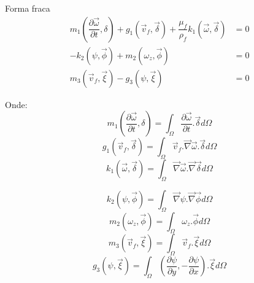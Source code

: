\documentclass{beamer}
\begin{document}
\begin{frame}
  \frametitle{\subsecname}
  
  \begin{block}{Forma fraca}
      \vspace*{-\baselineskip}\setlength\belowdisplayshortskip{0pt} %
    \begin{align*}
      m_1 \left(\dfrac{\partial \vec{\omega}}{\partial t}, \delta\right) +
      g_1 (\vec{v}_f, \vec{\delta}) + 
      \dfrac{\mu_f}{\rho_f} k_1 (\vec{\omega}, \vec{\delta}) &=0\\
      -k_2 (\psi, \vec{\phi}) +
      m_2 (\omega_z, \vec{\phi}) &= 0 \\
      m_3 (\vec{v}_f, \vec{\xi}) - 
      g_3 (\psi, \vec{\xi}) &=0
    \end{align*}
  \end{block}
  
  \fontsize{8}{7.2}\selectfont
  \begin{minipage}{.48\textwidth}
    \begin{block}{Onde:}
    \begin{equation*}
	m_1 \left(\dfrac{\partial \vec{\omega}}{\partial t}, \delta\right) =
	\int_{\Omega}
	\dfrac{\partial \vec{\omega}}{\partial t}
	.\vec{\delta} d\Omega
      \end{equation*}
      \begin{equation*}
	g_1 (\vec{v}_f, \vec{\delta}) =
	\int_{\Omega}
	\vec{v}_f.\vec{\nabla}\vec{\omega}
	.\vec{\delta} d\Omega
      \end{equation*}
      \begin{equation*}
	k_1 (\vec{\omega}, \vec{\delta}) =
	\int_{\Omega}
	\vec{\nabla}\vec{\omega}.\vec{\nabla}
	\vec{\delta} d\Omega
      \end{equation*}
    \end{block}
  \end{minipage}
  \hfill
  \begin{minipage}{.48\textwidth}
    \begin{block}{}
      \begin{equation*}
	k_2 (\psi, \vec{\phi}) =
	\int_{\Omega}
	\vec{\nabla}\psi.\vec{\nabla}
	\vec{\phi} d\Omega
      \end{equation*}
      \begin{equation*}
	m_2 (\omega_z, \vec{\phi}) =
	\int_{\Omega}
	\omega_z
	.\vec{\phi} d\Omega
      \end{equation*}
      \begin{equation*}
	m_3 (\vec{v}_f, \vec{\xi}) =
	\int_{\Omega}
	\vec{v}_f
	.\vec{\xi} d\Omega
      \end{equation*}
      \begin{equation*}
	g_3 (\psi, \vec{\xi}) =
	\int_{\Omega}
	\left(\dfrac{\partial \psi}{\partial y},
	-\dfrac{\partial \psi}{\partial x} \right)
	.\vec{\xi} d\Omega
      \end{equation*}
    \end{block}
  \end{minipage}
\end{frame}
\end{document}

